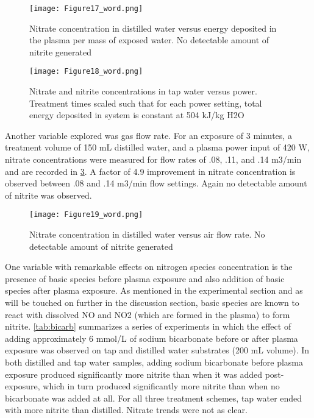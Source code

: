 \begin{figure}[htbp]
  \centering
  \texttt{[image: Figure17\_word.png]}
  \caption{Nitrate concentration in distilled water versus energy deposited in the plasma per mass of exposed water. No detectable amount of nitrite generated}
  \label{fig:nitrogen_vs_energy}
\end{figure}

\begin{figure}[htbp]
  \centering
  \texttt{[image: Figure18\_word.png]}
  \caption{Nitrate and nitrite concentrations in tap water versus power.  Treatment times scaled such that for each power setting, total energy deposited in system is constant at 504 kJ/kg H2O}
  \label{fig:nitrogen_vs_power}
\end{figure}

Another variable explored was gas flow rate.  For an exposure of 3 minutes, a treatment volume of 150 mL distilled water, and a plasma power input of 420 W, nitrate concentrations were measured for flow rates of .08, .11, and .14 m3/min and are recorded in \cref{fig:nitrogen_vs_flow}.  A factor of 4.9 improvement in nitrate concentration is observed between .08 and .14 m3/min flow settings.  Again no detectable amount of nitrite was observed.

\begin{figure}[htbp]
  \centering
  \texttt{[image: Figure19\_word.png]}
  \caption{Nitrate concentration in distilled water versus air flow rate. No detectable amount of nitrite generated}
  \label{fig:nitrogen_vs_flow}
\end{figure}

One variable with remarkable effects on nitrogen species concentration is the presence of basic species before plasma exposure and also addition of basic species after plasma exposure.  As mentioned in the experimental section and as will be touched on further in the discussion section, basic species are known to react with dissolved NO and NO2 (which are formed in the plasma) to form nitrite. \cref{tab:bicarb} summarizes a series of experiments in which the effect of adding approximately 6 mmol/L of sodium bicarbonate before or after plasma exposure was observed on tap and distilled water substrates (200 mL volume).  In both distilled and tap water samples, adding sodium bicarbonate before plasma exposure produced significantly more nitrite than when it was added post-exposure, which in turn produced significantly more nitrite than when no bicarbonate was added at all.  For all three treatment schemes, tap water ended with more nitrite than distilled.  Nitrate trends were not as clear.


